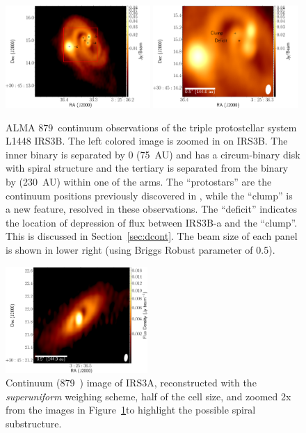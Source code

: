 

\begin{figure}[H]
\begin{center}
   \includegraphics[width=0.49\textwidth]{img/L1448IRS3B_cont_robust05triplet_uc_forpos.pdf} %
   \includegraphics[width=0.49\textwidth]{img/L1448IRS3B_cont_robust05triplet_uc_positions.pdf} %
\end{center}
   \caption{ALMA 879~\micron\space continuum observations of the triple protostellar system L1448 IRS3B. The left colored image is zoomed in on IRS3B. The inner binary is separated by 0 (75~AU) and has a circum-binary disk with spiral structure and the tertiary is separated from the binary by  (230~AU) within one of the arms. The ``protostars'' are the continuum positions previously discovered in \citet{2016Natur.538..483T}, while the ``clump'' is a new feature, resolved in these observations. The ``deficit'' indicates the location of depression of flux between IRS3B-a and the ``clump''. This is discussed in Section~\ref{sec:dcont}. The beam size of each panel is shown in lower right (\contbeam\space using Briggs Robust parameter of 0.5).}\label{fig:zoomincont}
\end{figure}


\begin{figure}[H]
  \begin{center}
   \includegraphics[width=0.48\textwidth]{img/L1448IRS3B-cont-irs3a-highres.pdf} %
   \end{center}
   \caption{Continuum (879~\micron) image of IRS3A, reconstructed with the \textit{superuniform} weighing scheme, half of the cell size, and zoomed 2x from the images in Figure~\ref{fig:zoomincont}\space to highlight the possible spiral substructure.} \label{fig:widesuperuniform}
\end{figure}


